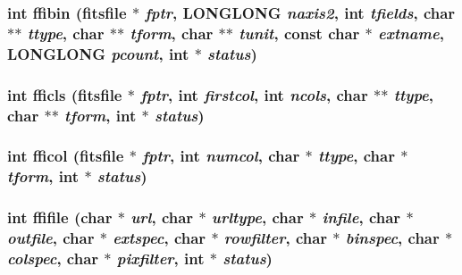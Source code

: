 \subsubsection{\setlength{\rightskip}{0pt plus 5cm}int ffibin (\bf{fitsfile} $\ast$ {\em fptr}, \bf{LONGLONG} {\em naxis2}, int {\em tfields}, char $\ast$$\ast$ {\em ttype}, char $\ast$$\ast$ {\em tform}, char $\ast$$\ast$ {\em tunit}, const char $\ast$ {\em extname}, \bf{LONGLONG} {\em pcount}, int $\ast$ {\em status})}\label{fitsio__64_8h_a58067cf409aa0fa133a4794c43264a3}


\subsubsection{\setlength{\rightskip}{0pt plus 5cm}int fficls (\bf{fitsfile} $\ast$ {\em fptr}, int {\em firstcol}, int {\em ncols}, char $\ast$$\ast$ {\em ttype}, char $\ast$$\ast$ {\em tform}, int $\ast$ {\em status})}\label{fitsio__64_8h_cd1a0072dd0c525e2263eb781403f1eb}


\subsubsection{\setlength{\rightskip}{0pt plus 5cm}int fficol (\bf{fitsfile} $\ast$ {\em fptr}, int {\em numcol}, char $\ast$ {\em ttype}, char $\ast$ {\em tform}, int $\ast$ {\em status})}\label{fitsio__64_8h_bbf8d6634ce0e3a4c6446730f4fae58a}


\subsubsection{\setlength{\rightskip}{0pt plus 5cm}int ffifile (char $\ast$ {\em url}, char $\ast$ {\em urltype}, char $\ast$ {\em infile}, char $\ast$ {\em outfile}, char $\ast$ {\em extspec}, char $\ast$ {\em rowfilter}, char $\ast$ {\em binspec}, char $\ast$ {\em colspec}, char $\ast$ {\em pixfilter}, int $\ast$ {\em status})}\label{fitsio__64_8h_a145a043753a554e3f743ee431fc65d6}


